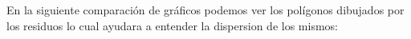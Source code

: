 En la siguiente comparación de gráficos podemos ver los polígonos dibujados por los residuos lo cual ayudara a entender la dispersion de los mismos:\\

\begin{figure}[H]
\end{figure}

